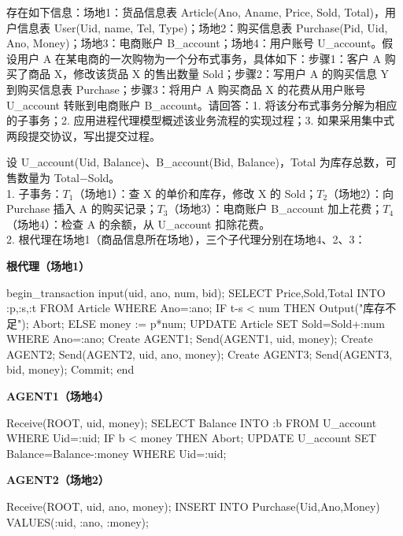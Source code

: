 \documentclass[10pt,a4paper]{article}
\newcommand{\zh}[1]{{\zhmono #1}}
\newenvironment{keep}{\par\noindent\begin{minipage}{\linewidth}\setlength{\parskip}{3pt plus 1pt}}{\end{minipage}\par\vspace{2pt}}
\begin{document}
\begin{keep}
\begin{prob}[2018 年第三题]
存在如下信息：场地1：货品信息表 Article(Ano, Aname, Price, Sold, Total)，用户信息表 User(Uid, name, Tel, Type)；场地2：购买信息表 Purchase(Pid, Uid, Ano, Money)；场地3：电商账户 B\_account；场地4：用户账号 U\_account。假设用户 A 在某电商的一次购物为一个分布式事务，具体如下：步骤1：客户 A 购买了商品 X，修改该货品 X 的售出数量 Sold；步骤2：写用户 A 的购买信息 Y 到购买信息表 Purchase；步骤3：将用户 A 购买商品 X 的花费从用户账号 U\_account 转账到电商账户 B\_account。请回答：1. 将该分布式事务分解为相应的子事务；2. 应用进程代理模型概述该业务流程的实现过程；3. 如果采用集中式两段提交协议，写出提交过程。
\end{prob}
\begin{ans}[2018 年第三题]
设 U\_account(Uid, Balance)、B\_account(Bid, Balance)，Total 为库存总数，可售数量为 Total$-$Sold。\\
1. 子事务：$T_1$（场地1）：查 X 的单价和库存，修改 X 的 Sold；$T_2$（场地2）：向 Purchase 插入 A 的购买记录；$T_3$（场地3）：电商账户 B\_account 加上花费；$T_4$（场地4）：检查 A 的余额，从 U\_account 扣除花费。\\
2. 根代理在场地1（商品信息所在场地），三个子代理分别在场地4、2、3：\\[1pt]
\begin{minipage}[t]{0.55\linewidth}
\textbf{根代理（场地1）}
\begin{code}
begin_transaction
 input(uid, ano, num, bid);
 SELECT Price,Sold,Total INTO :p,:s,:t
   FROM Article WHERE Ano=:ano;
 IF t-s < num THEN
   Output("\zh{库存不足}"); Abort;
 ELSE
   money := p*num;
   UPDATE Article SET Sold=Sold+:num
     WHERE Ano=:ano;
   Create AGENT1; Send(AGENT1, uid, money);
   Create AGENT2; Send(AGENT2, uid, ano, money);
   Create AGENT3; Send(AGENT3, bid, money);
   Commit;
end
\end{code}
\end{minipage}\hfill
\begin{minipage}[t]{0.43\linewidth}
\textbf{AGENT1（场地4）}
\begin{code}
Receive(ROOT, uid, money);
SELECT Balance INTO :b
  FROM U_account WHERE Uid=:uid;
IF b < money THEN Abort;
UPDATE U_account
  SET Balance=Balance-:money
  WHERE Uid=:uid;
\end{code}
\textbf{AGENT2（场地2）}
\begin{code}
Receive(ROOT, uid, ano, money);
INSERT INTO Purchase(Uid,Ano,Money)
  VALUES(:uid, :ano, :money);

\end{code}
\end{minipage}
\end{ans}
\end{keep}
\end{document}
